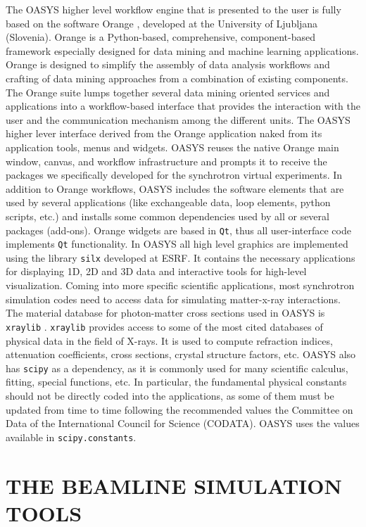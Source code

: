 \documentclass{aip-cp}
\begin{document}
The OASYS higher level workflow engine that is presented to the user is fully based on the software Orange \cite{orange}, developed at the University of Ljubljana (Slovenia). Orange is a Python-based, comprehensive, component-based framework especially designed for data mining and machine learning applications. Orange is designed to simplify the assembly of data analysis workflows and crafting of data mining approaches from a combination of existing components. The Orange suite lumps together several data mining oriented services and applications into a workflow-based interface that provides the interaction with the user and the communication mechanism among the different units. The OASYS higher lever interface derived from the Orange application naked  from its application tools, menus and widgets. OASYS reuses the native Orange main window, canvas, and workflow infrastructure and prompts it to receive the packages we specifically developed for the synchrotron virtual experiments. In addition to Orange workflows, OASYS includes the software elements that are used by several applications (like exchangeable data, loop elements, python scripts, etc.) and installs some common dependencies used by all or several packages (add-ons). Orange widgets are based in {\tt Qt}, thus all user-interface code implements {\tt Qt} functionality. In OASYS all  high level graphics are implemented using the library {\tt silx} \cite{silx} developed at ESRF. It contains the necessary applications for displaying 1D, 2D and 3D data and interactive tools for high-level visualization. Coming into more specific scientific applications, most synchrotron simulation codes need to access data for simulating matter-x-ray interactions. The material database for photon-matter cross sections used in OASYS is {\tt xraylib} \cite{xraylib}. {\tt xraylib} provides access to some of the most cited databases of physical data in the field of X-rays. It is used to compute refraction indices, attenuation coefficients, cross sections, crystal structure factors, etc.  OASYS also has {\tt scipy} as a dependency, as it is commonly used for many scientific calculus, fitting, special functions, etc. In particular, the fundamental physical constants should not be directly coded into the applications, as some of them must be updated from time to time following the recommended values the Committee on Data of the International Council for Science (CODATA). OASYS uses the values available in {\tt scipy.constants}.

\section{THE BEAMLINE SIMULATION TOOLS}
\end{document}
